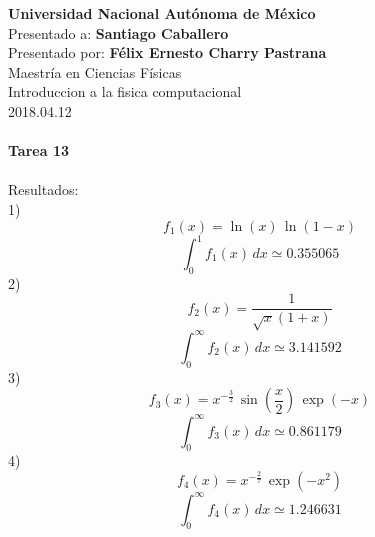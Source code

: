 \documentclass[10pt,letterpaper]{article}
\author{F\'elix Ernesto Charry Pastrana}
\begin{document}
\textbf{Universidad Nacional Autónoma de México} \\
Presentado a: \textbf{Santiago Caballero} \\
Presentado por: \textbf{Félix Ernesto Charry Pastrana }\\
Maestría en Ciencias Físicas \\
Introduccion a la fisica computacional \\
2018.04.12 \\
\\
{\Large \textbf{Tarea 13}}
\\
\\
Resultados: 
\\
1) 
\[
f_1(x) = \ln(x)\,\ln(1-x)
\]
\[
\int_{0}^{1} f_1(x) \,dx \simeq 0.355065 
\]
2) 
\[
f_2(x) = \dfrac{1}{\sqrt{x} (1+x)}
\]
\[
\int_{0}^{\infty} f_2(x) \,dx \simeq 3.141592 
\]
3) 
\[
f_3(x) = x^{-\frac{3}{2}}\,\sin\left(\dfrac{x}{2}\right)\,\exp(-x)
\]
\[
\int_{0}^{\infty} f_3(x) \,dx \simeq 0.861179 
\]
4) 
\[
f_4(x) = x^{-\frac{2}{7}}\,\exp(-x^2)
\]
\[
\int_{0}^{\infty} f_4(x) \,dx \simeq 1.246631 
\]
\end{document}
